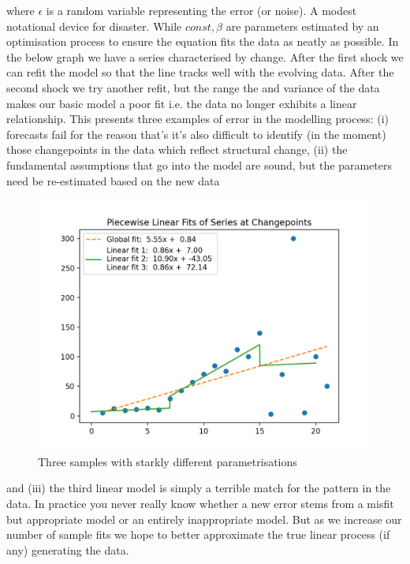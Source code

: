 \documentclass[10pt,a4paper,notitlepage, twocolumn]{article}
\begin{document}
\noindent where $\epsilon$ is a random variable representing the error (or noise). A modest notational device for disaster. While $const, \beta$ are parameters estimated by an optimisation process to ensure the equation fits the data as neatly as possible. In the below graph we have a series characterised by change. After the first shock we can refit the model so that the line tracks well with the evolving data. After the second shock we try another refit, but the range the and variance of the data makes our basic model a poor fit i.e. the data no longer exhibits a linear relationship. This presents three examples of error in the modelling process: (i) forecasts fail for the reason that's it's also difficult to identify (in the moment) those changepoints in the data which reflect structural change, (ii)  the fundamental assumptions that go into the model are sound, but the parameters need be re-estimated based on the new data
\begin{figure}[H]
  \includegraphics[width=\linewidth]{./Plots/piecewise_linear_fits.png}
  \caption{Three samples with starkly different parametrisations}
\end{figure}
and (iii) the third linear model is simply a terrible match for the pattern in the data. In practice you never really know whether a new error stems from a misfit but appropriate model or an entirely inappropriate model. But as we increase our number of sample fits we hope to better approximate the true linear process (if any) generating the data. 
\end{document}
